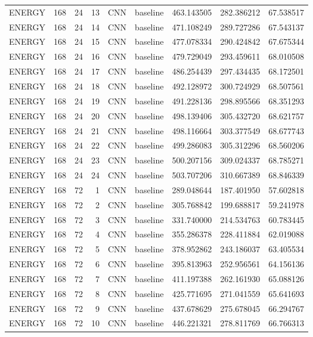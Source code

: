 \begin{table}
\begin{tabular}{lrrrllrrr}
ENERGY & 168 & 24 & 13 & CNN & baseline & 463.143505 & 282.386212 & 67.538517 \\
ENERGY & 168 & 24 & 14 & CNN & baseline & 471.108249 & 289.727286 & 67.543137 \\
ENERGY & 168 & 24 & 15 & CNN & baseline & 477.078334 & 290.424842 & 67.675344 \\
ENERGY & 168 & 24 & 16 & CNN & baseline & 479.729049 & 293.459611 & 68.010508 \\
ENERGY & 168 & 24 & 17 & CNN & baseline & 486.254439 & 297.434435 & 68.172501 \\
ENERGY & 168 & 24 & 18 & CNN & baseline & 492.128972 & 300.724929 & 68.507561 \\
ENERGY & 168 & 24 & 19 & CNN & baseline & 491.228136 & 298.895566 & 68.351293 \\
ENERGY & 168 & 24 & 20 & CNN & baseline & 498.139406 & 305.432720 & 68.621757 \\
ENERGY & 168 & 24 & 21 & CNN & baseline & 498.116664 & 303.377549 & 68.677743 \\
ENERGY & 168 & 24 & 22 & CNN & baseline & 499.286083 & 305.312296 & 68.560206 \\
ENERGY & 168 & 24 & 23 & CNN & baseline & 500.207156 & 309.024337 & 68.785271 \\
ENERGY & 168 & 24 & 24 & CNN & baseline & 503.707206 & 310.667389 & 68.846339 \\
ENERGY & 168 & 72 & 1 & CNN & baseline & 289.048644 & 187.401950 & 57.602818 \\
ENERGY & 168 & 72 & 2 & CNN & baseline & 305.768842 & 199.688817 & 59.241978 \\
ENERGY & 168 & 72 & 3 & CNN & baseline & 331.740000 & 214.534763 & 60.783445 \\
ENERGY & 168 & 72 & 4 & CNN & baseline & 355.286378 & 228.411884 & 62.019088 \\
ENERGY & 168 & 72 & 5 & CNN & baseline & 378.952862 & 243.186037 & 63.405534 \\
ENERGY & 168 & 72 & 6 & CNN & baseline & 395.813963 & 252.956561 & 64.156136 \\
ENERGY & 168 & 72 & 7 & CNN & baseline & 411.197388 & 262.161930 & 65.088126 \\
ENERGY & 168 & 72 & 8 & CNN & baseline & 425.771695 & 271.041559 & 65.641693 \\
ENERGY & 168 & 72 & 9 & CNN & baseline & 437.678629 & 275.678045 & 66.294767 \\
ENERGY & 168 & 72 & 10 & CNN & baseline & 446.221321 & 278.811769 & 66.766313 \\

\end{tabular}
\end{table}
